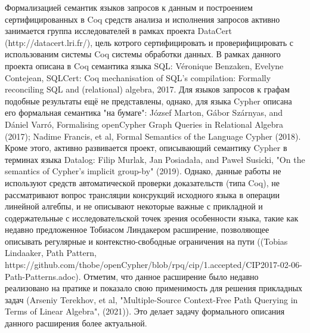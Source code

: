 \documentclass[12pt]{article}  %
\theoremstyle{remark}
\begin{document}
Формализацией семантик языков запросов к данным и построением сертифицированных в Coq средств анализа и исполнения запросов активно занимается группа исследователей в рамках проекта DataCert (http://datacert.lri.fr/), цель котрого сертифицировать и проверифицировать с использованим системы Coq системы обработки данных. В рамках данного проекта описана в Coq семантика языка SQL: Véronique Benzaken, Evelyne Contejean, SQLCert: Coq mechanisation of SQL’s compilation: Formally reconciling SQL and (relational) algebra, 2017. Для языков запросов к графам подобные результаты ещё не представлены, однако, для языка Cypher описана его формальная семантика "на бумаге": József Marton, Gábor Szárnyas, and Dániel Varró, Formalising openCypher Graph Queries in Relational Algebra (2017); Nadime Francis, et al, Formal Semantics of the Language Cypher (2018). Кроме этого, активно развивается проект, описывающий семантику Cypher в терминах языка Datalog: Filip Murlak, Jan Posiadała, and Paweł Susicki, "On the semantics of Cypher's implicit group-by" (2019). Однако, данные работы не используют средств автоматической проверки доказательств (типа Coq), не рассматривают вопрос трансляции консрукций исходного языка в операции линейной алгебпы, и не описывают некоторые важные с прикладной и содержательные с исследовательской точек зрения особенности языка, такие как недавно предложенное Тобиасом Линдакером расширение, позволяющее описывать регулярные и контекстно-свободные ограничения на пути ((Tobias Lindaaker, Path Pattern, https://github.com/thobe/openCypher/blob/rpq/cip/1.accepted/CIP2017-02-06-Path-Patterns.adoc). Отметим, что данное расширение было недавно реализовано на пратике и показало свою применимость для решения прикладных задач (Arseniy Terekhov, et al, "Multiple-Source Context-Free Path Querying in Terms of Linear Algebra", (2021)). Это делает задачу формального описания данного расширения более актуальной.
\end{document}
